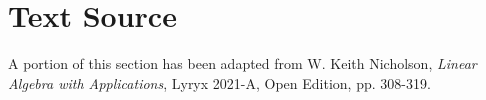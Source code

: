 \documentclass{ximera}
\begin{document}










\section*{Text Source}
A portion of this section has been adapted from
W. Keith Nicholson, {\it Linear Algebra with Applications}, Lyryx 2021-A, Open Edition, pp. 308-319.
\end{document}
